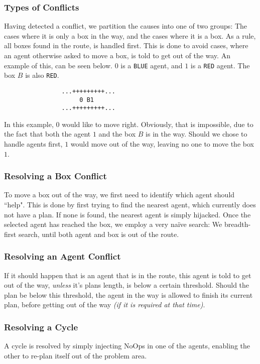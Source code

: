 \documentclass[letterpaper]{article}
\begin{document}
		\subsubsection{Types of Conflicts}
			Having detected a conflict, we partition the causes into one of two groups: The cases where it is only a box in the way, and the cases where it is a box. As a rule, all boxes found in the route, is handled first. This is done to avoid cases, where an agent otherwise asked to move a box, is told to get out of the way. An example of this, can be seen below. $0$ is a \verb=BLUE= agent, and $1$ is a \verb=RED= agent. The box $B$ is also \verb=RED=. 
			\begin{verbatim}
				...+++++++++...
				     0 B1
				...+++++++++...
			\end{verbatim}
			In this example, $0$ would like to move right. Obviously, that is impossible, due to the fact that both the agent $1$ and the box $B$ is in the way. Should we chose to handle agents first, $1$ would move out of the way, leaving no one to move the box $1$.

		\subsubsection{Resolving a Box Conflict}
			To move a box out of the way, we first need to identify which agent should ``help". This is done by first trying to find the nearest agent, which currently does not have a plan. If none is found, the nearest agent is simply hijacked. Once the selected agent has reached the box, we employ a very naïve search: We breadth-first search, until both agent and box is out of the route.

		\subsubsection{Resolving an Agent Conflict}
			If it should happen that is an agent that is in the route, this agent is told to get out of the way, \emph{unless} it's plans length, is below a certain threshold. Should the plan be below this threshold, the agent in the way is allowed to finish its current plan, before getting out of the way \emph{(if it is required at that time)}.

		\subsubsection{Resolving a Cycle}
			A cycle is resolved by simply injecting NoOps in one of the agents, enabling the other to re-plan itself out of the problem area.
		
\end{document}
